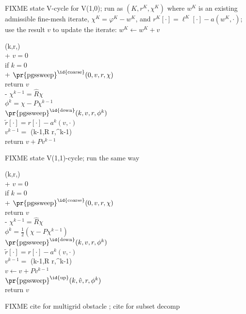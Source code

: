 \documentclass[letterpaper,final,12pt,reqno]{amsart}
\theoremstyle{claim}
\numberwithin{equation}{section}
\numberwithin{figure}{section}
\numberwithin{table}{section}
\begin{document}
FIXME state V-cycle for V(1,0); run as $(K,r^K,\chi^K)$ where $w^K$ is an existing admissible fine-mesh iterate, $\chi^K=\varphi^K-w^K$, and $r^K[\cdot] = \ell^K[\cdot] - a(w^K,\cdot)$; use the result $v$ to update the iterate: $w^K \gets w^K + v$
\begin{pseudo*}
(k,r,\chi)\text{:} \\+
    $v=0$ \\
    if $k=0$ \\+
        $\text{\pr{pgssweep}}^{\text{\id{coarse}}}(0,v,r,\chi)$ \\
        return $v$ \\-
    $\chi^{k-1} = \hat R \chi$ \\
    $\phi^k = \chi - P\chi^{k-1}$ \\
    $\text{\pr{pgssweep}}^{\text{\id{down}}}(k,v,r,\phi^k)$ \\
    $\tilde r[\cdot] = r[\cdot] - a^k(v,\cdot)$ \\
    $v^{k-1} =$ (k-1,R \tilde r,\chi^{k-1}) \\
    return $v + P v^{k-1}$
\end{pseudo*}


FIXME state V(1,1)-cycle; run the same way
\begin{pseudo*}
(k,r,\chi)\text{:} \\+
    $v=0$ \\
    if $k=0$ \\+
        $\text{\pr{pgssweep}}^{\text{\id{coarse}}}(0,v,r,\chi)$ \\
        return $v$ \\-
    $\chi^{k-1} = \hat R \chi$ \\
    $\phi^k = \frac{1}{2} (\chi - P\chi^{k-1})$ \\
    $\text{\pr{pgssweep}}^{\text{\id{down}}}(k,v,r,\phi^k)$ \\
    $\tilde r[\cdot] = r[\cdot] - a^k(v,\cdot)$ \\
    $v^{k-1} =$ (k-1,R \tilde r,\chi^{k-1}) \\
    $v \gets v + P v^{k-1}$ \\
    $\text{\pr{pgssweep}}^{\text{\id{up}}}(k,\hat v,r,\phi^k)$ \\
    return $v$
\end{pseudo*}

FIXME cite for multigrid obstacle \cite{BrandtCryer1983,Bueler2021,GraeserKornhuber2009,Jouvetetal2013}; cite for subset decomp \cite{Tai2003}
\end{document}
